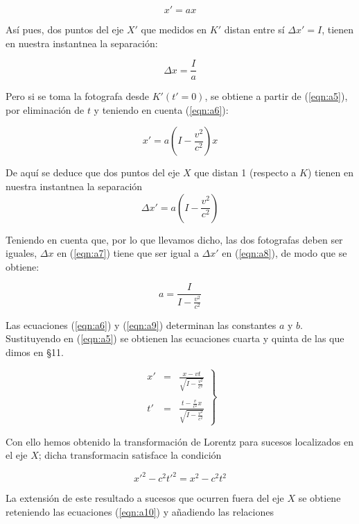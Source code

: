 \documentclass[spanish]{book}
\begin{document}
\[x'=ax\]

Así pues, dos puntos del eje $X'$ que medidos en $K'$ distan entre sí $\Delta x'=I$, tienen en
nuestra instantnea la separación:

\begin{equation}
\Delta x=\frac{I}{a}\label{eqn:a7}
\end{equation}

\noindent Pero si se toma la fotografa desde $K'(t'=0)$, se obtiene a partir de (\ref{eqn:a5}), por
eliminación de $t$ y teniendo en cuenta (\ref{eqn:a6}):

\[x'=a\left(I-\frac{v^{2}}{c^{2}}\right)x\]


\noindent   De aquí se deduce que dos puntos del eje $X$ que distan 1 (respecto a $K$) tienen en
nuestra instantnea la separación
\begin{equation}
\Delta x'=a\left(I-\frac{v^{2}}{c^{2}}\right)\label{eqn:a8}
\end{equation}

Teniendo en cuenta que, por lo que llevamos dicho, las dos fotografas deben ser
iguales, $\Delta x$ en (\ref{eqn:a7}) tiene que ser igual a $\Delta x'$ en (\ref{eqn:a8}), de modo que se obtiene:

\begin{equation}
a=\frac{I}{I-\frac{v^{2}}{c^{2}}}\label{eqn:a9}
\end{equation}

Las ecuaciones (\ref{eqn:a6}) y (\ref{eqn:a9}) determinan las constantes $a$ y $b$. Sustituyendo en (\ref{eqn:a5}) se
obtienen las ecuaciones cuarta y quinta de las que dimos en \S 11.

\begin{equation}
\left.\begin{array}{rcl}
x' & = & \frac{x-vt}{\sqrt{I-\frac{v^{2}}{c^{2}}}}\\
~\\
t' & = & \frac{t-\frac{v}{c^{2}}x}{\sqrt{I-\frac{v^{2}}{c^{2}}}}\end{array}\right\} \label{eqn:a10}
\end{equation}

Con ello hemos obtenido la transformación de Lorentz para sucesos localizados
en el eje $X$; dicha transformacin satisface la condición

\begin{equation}
x'^{2}-c^{2}t'^{2}=x^{2}-c^{2}t^{2}\label{eqn:a11}
\end{equation}

La extensión de este resultado a sucesos que ocurren fuera del eje $X$ se obtiene
reteniendo las ecuaciones (\ref{eqn:a10}) y añadiendo las relaciones
\end{document}
